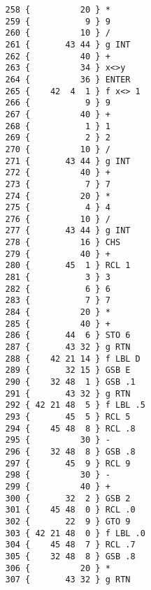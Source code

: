 \documentclass[swedish,a4paper,onepage, 11pt]{scrbook}
\begin{document}
\begin{multicols}{2}
\begin{lstlisting}
   258 {          20 } *
   259 {           9 } 9
   260 {          10 } /
   261 {       43 44 } g INT
   262 {          40 } +
   263 {          34 } x<>y
   264 {          36 } ENTER
   265 {    42  4  1 } f x<> 1
   266 {           9 } 9
   267 {          40 } +
   268 {           1 } 1
   269 {           2 } 2
   270 {          10 } /
   271 {       43 44 } g INT
   272 {          40 } +
   273 {           7 } 7
   274 {          20 } *
   275 {           4 } 4
   276 {          10 } /
   277 {       43 44 } g INT
   278 {          16 } CHS
   279 {          40 } +
   280 {       45  1 } RCL 1
   281 {           3 } 3
   282 {           6 } 6
   283 {           7 } 7
   284 {          20 } *
   285 {          40 } +
   286 {       44  6 } STO 6
   287 {       43 32 } g RTN
   288 {    42 21 14 } f LBL D
   289 {       32 15 } GSB E
   290 {    32 48  1 } GSB .1
   291 {       43 32 } g RTN
   292 { 42 21 48  5 } f LBL .5
   293 {       45  5 } RCL 5
   294 {    45 48  8 } RCL .8
   295 {          30 } -
   296 {    32 48  8 } GSB .8
   297 {       45  9 } RCL 9
   298 {          30 } -
   299 {          40 } +
   300 {       32  2 } GSB 2
   301 {    45 48  0 } RCL .0
   302 {       22  9 } GTO 9
   303 { 42 21 48  0 } f LBL .0
   304 {    45 48  7 } RCL .7
   305 {    32 48  8 } GSB .8
   306 {          20 } *
   307 {       43 32 } g RTN 
\end{lstlisting}
\end{multicols}


\end{document}
